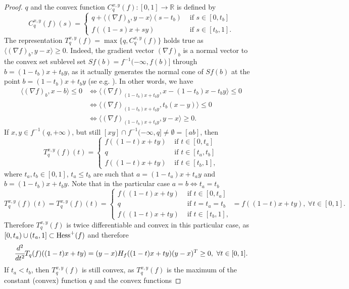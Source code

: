 \documentclass[12pt,twoside,reqno]{amsart}
\theoremstyle{definition}
\numberwithin{equation}{section}
\begin{document}
\begin{proof}
$q$ and the convex function
$C_q^{x,y}(f):[0,1]\longrightarrow\mathbb{R}$ is defined by
\[
C_q^{x,y}(f)(s)=\left\{
\begin{array}{cll}
q+\langle (\nabla f)_b,y-x\rangle(s-t_b) & \mbox{ if }s\in[0,t_b]\\
f((1-s)x+sy) & \mbox{ if }s\in[t_b,1].
\end{array}
\right.
\] 
The representation $T_q^{x,y}(f)=\max\{q,C_q^{x,y}(f)\}$ holds true as $\langle (\nabla f)_b,y-x\rangle\geq 0$. Indeed, the gradient vector 
$(\nabla f)_b$ is a normal vector to the convex set sublevel set 
$Sf(b)=f^{-1}(-\infty,f(b)]$
through $b=(1-t_b)x+t_by$, 
as it actually generates the normal cone of $Sf(b)$ at the point $b=(1-t_b)x+t_by$ (se e.g. \cite[Theorem 1.3.5, p. 245]{Uruty-Lemarechal}). 
In other words, we have
\begin{align}
\langle (\nabla f)_b,x-b\rangle\leq 0 & \Leftrightarrow\langle (\nabla f)_{(1-t_b)x+t_by},x-(1-t_b)x-t_by\rangle\leq 0 \nonumber\\ 
& \Leftrightarrow \langle (\nabla f)_{(1-t_b)x+t_by},t_b(x-y)\rangle\leq 0\nonumber\\
& \Leftrightarrow \langle (\nabla f)_{(1-t_b)x+t_by},y-x\rangle\geq 0. \nonumber
\end{align}
If $x,y\in f^{-1}(q,+\infty)$, but still $[xy]\cap f^{-1}(-\infty,q]\neq\emptyset=[ab]$, then 
\[
T_q^{x,y}(f)(t)=\left\{
\begin{array}{cll}
f((1-t)x+ty)& \mbox{ if }t\in[0,t_a]\\
q & \mbox{ if }t\in[t_a,t_b]\\
f((1-t)x+ty)& \mbox{ if }t\in[t_b,1],
\end{array}
\right.
\]
where $t_a,t_b\in[0,1]$, $t_a\leq t_b$ are such that $a=(1-t_a)x+t_ay$ and $b=(1-t_b)x+t_by$. Note that in the particular case $a=b\Leftrightarrow t_a=t_b$ 
\[
T_q^{x,y}(f)(t)=T_q^{x,y}(f)(t)=\left\{
\begin{array}{cll}
f((1-t)x+ty)& \mbox{ if }t\in[0,t_a]\\
q & \mbox{ if }t=t_a=t_b\\
f((1-t)x+ty)& \mbox{ if }t\in[t_b,1],
\end{array}
\right.=f((1-t)x+ty), \ \forall t\in[0,1].
\] 
Therefore $T_q^{x,y}(f)$ is twice differentiable and convex in this particular case, as $[0,t_a)\cup(t_a,1]\subset {\rm Hess}^+(f)$ and therefore
\[
 \cfrac{d^2}{dt^2}T_q(f)((1-t)x+ty)=(y-x)H_f((1-t)x+ty)(y-x)^T\geq 0, \ \forall t\in[0,1].
\]
If $t_a<t_b$, then $T_q^{x,y}(f)$ is still convex, as $T_q^{x,y}(f)$ is the maximum of the constant (convex) function $q$ and the convex functions

\end{proof}
\end{document}
